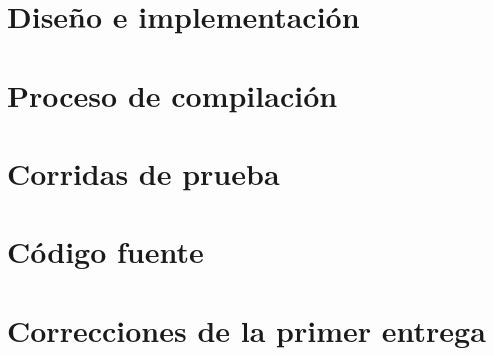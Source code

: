 \documentclass[11pt,a4paper]{article}
\begin{document}
		

	\setcounter{page}{1}
	\section{Diseño e implementación}	\label{sec:design}
		

	\section{Proceso de compilación} 	\label{sec:comp}
		

	\section{Corridas de prueba}
		
	
	\section{Código fuente}
		
\pagebreak	
	\section{Correcciones de la primer entrega}
		
\end{document}

